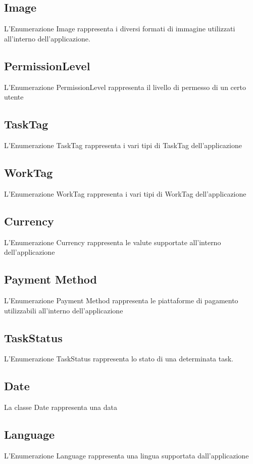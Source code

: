 \documentclass{report}
\begin{document}
\subsection*{Image}
L'Enumerazione Image rappresenta i diversi formati di immagine utilizzati all'interno dell'applicazione.
\subsection*{PermissionLevel}
L'Enumerazione PermissionLevel rappresenta il livello di permesso di un certo utente
\subsection*{TaskTag}
L'Enumerazione TaskTag rappresenta i vari tipi di TaskTag dell'applicazione
\subsection*{WorkTag}
L'Enumerazione WorkTag rappresenta i vari tipi di WorkTag dell'applicazione
\subsection*{Currency}
L'Enumerazione Currency rappresenta le valute supportate all'interno dell'applicazione
\subsection*{Payment Method}
L'Enumerazione Payment Method rappresenta le piattaforme di pagamento utilizzabili all'interno dell'applicazione 
\subsection*{TaskStatus}
L'Enumerazione TaskStatus rappresenta lo stato di una determinata task.
\subsection*{Date}
La classe Date rappresenta una data
\subsection*{Language}
L'Enumerazione Language rappresenta una lingua supportata dall'applicazione
\end{document}
